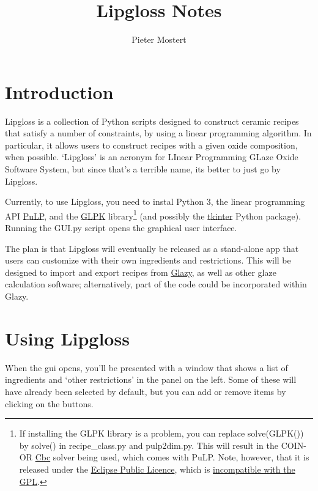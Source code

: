 \documentclass[a4paper,10pt]{article}
\title{Lipgloss Notes}
\author{Pieter Mostert}%
\def\'{\textquotesingle}
\begin{document}
\maketitle
\def\thefootnote{\fnsymbol{footnote}}\setcounter{footnote}{1}
\section{Introduction}
Lipgloss is a collection of Python scripts designed to construct ceramic recipes that satisfy a number of constraints, by using a linear programming algorithm. In particular, it allows users to construct recipes with a given oxide composition, when possible. `Lipgloss' is an acronym for LInear Programming GLaze Oxide Software System, but since that's a terrible name, it\'s better to just go by Lipgloss.

Currently, to use Lipgloss, you need to instal Python 3, the linear programming API \href{https://github.com/coin-or/pulp}{PuLP}, and the \href{https://www.gnu.org/software/glpk/}{GLPK} library\footnote{If installing the GLPK library is a problem, you can replace solve(GLPK()) by solve() in recipe\_class.py and pulp2dim.py. This will result in the COIN-OR \href{https://projects.coin-or.org/Cbc}{Cbc} solver being used, which comes with PuLP. Note, however, that it is released under the \href{https://en.wikipedia.org/wiki/Eclipse_Public_License}{Eclipse Public Licence}, which is \href{https://eclipse.org/legal/eplfaq.php}{incompatible with the GPL}.} (and possibly the \href{https://wiki.python.org/moin/TkInter}{tkinter} Python package). Running the GUI.py script opens the graphical user interface. 

The plan is that Lipgloss will eventually be released as a stand-alone app that users can customize with their own ingredients and restrictions. This will be designed to import and export recipes from \href{https://glazy.org}{Glazy}, as well as other glaze calculation software; alternatively, part of the code could be incorporated within Glazy.

\section{Using Lipgloss}

When the gui opens, you'll be presented with a window that shows a list of ingredients and `other restrictions' in the panel on the left. Some of these will have already been selected by default, but you can add or remove items by clicking on the buttons.
\end{document}
